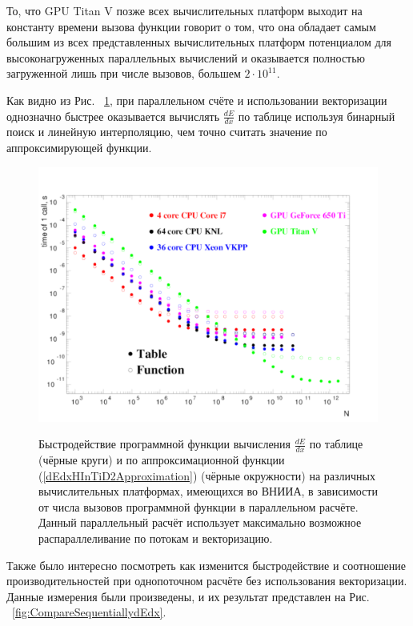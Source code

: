 \documentclass[a4paper,12pt]{article}
\begin{document}
\begin{large}
	То, что GPU Titan V позже всех вычислительных платформ выходит на константу времени вызова функции говорит о том, что она обладает самым большим из всех представленных вычислительных платформ потенциалом для высоконагруженных параллельных вычислений и оказывается полностью загруженной лишь при числе вызовов, большем $2 \cdot 10^{11}$. 
	 
	Как видно из Рис. ~\ref{fig:CompareParallellydEdx}, при параллельном счёте и использовании векторизации однозначно быстрее оказывается вычислять $\frac{dE}{dx}$ по таблице используя бинарный поиск и линейную интерполяцию, чем точно считать значение по аппроксимирующей функции.
	 

\begin{figure}[ht]
  {
     \includegraphics[width=0.99\linewidth]{images/compare_parallelly_dEdx.pdf}
  }
  \caption{Быстродействие программной функции вычисления $\frac{dE}{dx}$ по таблице (чёрные круги) и по аппроксимационной функции (\ref{dEdxHInTiD2Approximation}) (чёрные окружности) на различных вычислительных платформах, имеющихся во ВНИИА, в зависимости от числа вызовов программной функции в параллельном расчёте. Данный параллельный расчёт использует максимально возможное распараллеливание по потокам и векторизацию.}
  \label{fig:CompareParallellydEdx}
\end{figure}

	Также было интересно посмотреть как изменится быстродействие и соотношение производительностей при однопоточном расчёте без использования векторизации.
	Данные измерения были произведены, и их результат представлен на Рис. ~\ref{fig:CompareSequentiallydEdx}.
	

\end{large}
\end{document}
